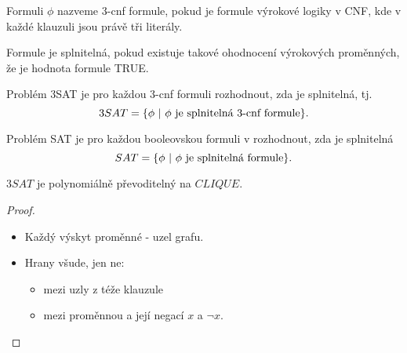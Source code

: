     \begin{frame}%
    \begin{definition}
    Formuli $\phi$ nazveme \alert{3-cnf formule}, pokud je formule výrokové logiky v CNF, kde v každé klauzuli jsou právě tři literály.
    
    Formule \alert{je splnitelná}, pokud existuje takové ohodnocení výrokových proměnných, že je hodnota formule TRUE.
    
    Problém \alert{3SAT} je pro každou 3-cnf formuli rozhodnout, zda je splnitelná, tj.
    $$3SAT=\{\phi \ |\  \phi \hbox{ je splnitelná 3-cnf formule}\}\hbox{.}
    $$
    
    Problém \alert{SAT} je pro každou booleovskou formuli v rozhodnout, zda je splnitelná
    $$SAT=\{\phi \ |\  \phi \hbox{ je splnitelná formule}\}\hbox{.}
    $$
    \end{definition}
    \vspace{-3mm}
    \pause
    \begin{theorem}
        $3SAT$ je polynomiálně převoditelný na $CLIQUE$.
    \end{theorem}
    \vspace{-3mm}
    \pause
    \begin{proof}
        \begin{itemize}
            \item Každý výskyt proměnné - uzel grafu.
            \item Hrany všude, jen ne:
            \begin{itemize}
                \item mezi uzly z téže klauzule
                \item mezi proměnnou a její negací $x$ a $\neg {x}$.
            \end{itemize}
        \end{itemize}
    \end{proof}
    \end{frame}
    
